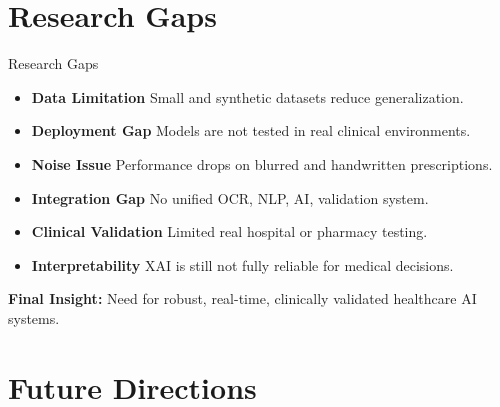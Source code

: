 \documentclass[11pt,aspectratio=169]{beamer}
\begin{document}
\section{Research Gaps}
\begin{frame}{Research Gaps}
\begin{itemize}

\item \textbf{Data Limitation}  
Small and synthetic datasets reduce generalization.

\item \textbf{Deployment Gap}  
Models are not tested in real clinical environments.

\item \textbf{Noise Issue}  
Performance drops on blurred and handwritten prescriptions.

\item \textbf{Integration Gap}  
No unified OCR, NLP, AI, validation system.

\item \textbf{Clinical Validation}  
Limited real hospital or pharmacy testing.

\item \textbf{Interpretability}  
XAI is still not fully reliable for medical decisions.

\end{itemize}

\vspace{0.15cm}

\textbf{Final Insight:}  
Need for robust, real-time, clinically validated healthcare AI systems.

\end{frame}






\section{Future Directions}
\end{document}
